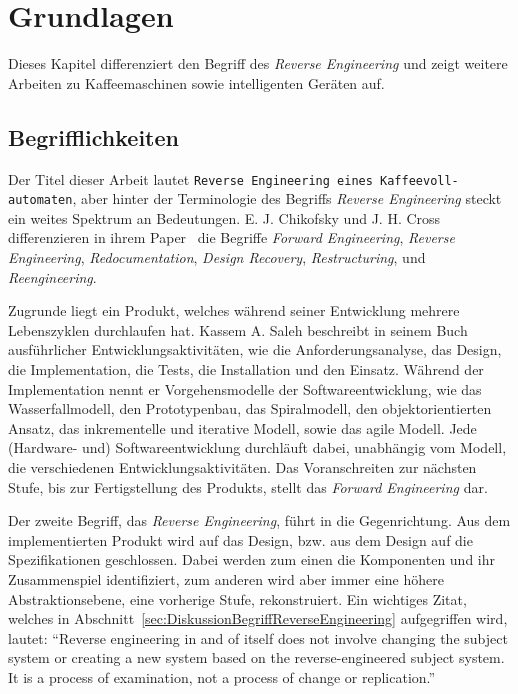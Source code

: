 \chapter{Grundlagen}\label{ch:Grundlagen}
Dieses Kapitel differenziert den Begriff des \textit{Reverse Engineering} und zeigt weitere Arbeiten zu Kaffeemaschinen sowie intelligenten Geräten auf.

\section{Begrifflichkeiten}\label{sec:Begrifflichkeiten}
Der Titel dieser Arbeit lautet \texttt{Reverse Engineering eines Kaffeevoll-\\automaten}, aber hinter der Terminologie des Begriffs \textit{Reverse Engineering} steckt ein weites Spektrum an Bedeutungen.
E. J. Chikofsky und J. H. Cross differenzieren in ihrem Paper~\cite{43044} die Begriffe \textit{Forward Engineering}, \textit{Reverse Engineering}, \textit{Redocumentation}, \textit{Design Recovery}, \textit{Restructuring}, und \textit{Reengineering}.

Zugrunde liegt ein Produkt, welches während seiner Entwicklung mehrere Lebenszyklen durchlaufen hat.
Kassem A. Saleh beschreibt in seinem Buch~\cite{Solr-599853700} ausführlicher Entwicklungsaktivitäten, wie die Anforderungsanalyse, das Design, die Implementation, die Tests, die Installation und den Einsatz.
Während der Implementation nennt er Vorgehensmodelle der Softwareentwicklung, wie das Wasserfallmodell, den Prototypenbau, das Spiralmodell, den objektorientierten Ansatz, das inkrementelle und iterative Modell, sowie das agile Modell.
Jede (Hardware- und) Softwareentwicklung durchläuft dabei, unabhängig vom Modell, die verschiedenen Entwicklungsaktivitäten.
Das Voranschreiten zur nächsten Stufe, bis zur Fertigstellung des Produkts, stellt das \textit{Forward Engineering} dar.

Der zweite Begriff, das \textit{Reverse Engineering}, führt in die Gegenrichtung.
Aus dem implementierten Produkt wird auf das Design, bzw. aus dem Design auf die Spezifikationen geschlossen.
Dabei werden zum einen die Komponenten und ihr Zusammenspiel identifiziert, zum anderen wird aber immer eine höhere Abstraktionsebene, eine vorherige Stufe, rekonstruiert.
Ein wichtiges Zitat, welches in Abschnitt~\ref{sec:DiskussionBegriffReverseEngineering}  aufgegriffen wird, lautet: "`Reverse engineering in and of itself does not involve changing the subject system or creating a new system based on the reverse-engineered subject system.
It is a process of examination, not a process of change or replication."'\cite{43044}

